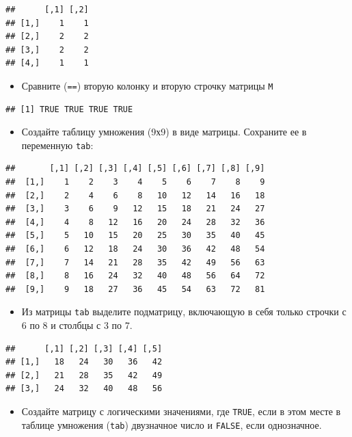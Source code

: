 \documentclass[]{book}
\providecommand{\tightlist}{%
  \setlength{\itemsep}{0pt}\setlength{\parskip}{0pt}}
\begin{document}
\begin{verbatim}
##      [,1] [,2]
## [1,]    1    1
## [2,]    2    2
## [3,]    2    2
## [4,]    1    1
\end{verbatim}

\begin{itemize}
\tightlist
\item
  Сравните (\texttt{==}) вторую колонку и вторую строчку матрицы \texttt{M}
\end{itemize}

\begin{verbatim}
## [1] TRUE TRUE TRUE TRUE
\end{verbatim}

\begin{itemize}
\tightlist
\item
  Создайте таблицу умножения (9х9) в виде матрицы. Сохраните ее в переменную \texttt{tab}:
\end{itemize}

\begin{verbatim}
##       [,1] [,2] [,3] [,4] [,5] [,6] [,7] [,8] [,9]
##  [1,]    1    2    3    4    5    6    7    8    9
##  [2,]    2    4    6    8   10   12   14   16   18
##  [3,]    3    6    9   12   15   18   21   24   27
##  [4,]    4    8   12   16   20   24   28   32   36
##  [5,]    5   10   15   20   25   30   35   40   45
##  [6,]    6   12   18   24   30   36   42   48   54
##  [7,]    7   14   21   28   35   42   49   56   63
##  [8,]    8   16   24   32   40   48   56   64   72
##  [9,]    9   18   27   36   45   54   63   72   81
\end{verbatim}

\begin{itemize}
\tightlist
\item
  Из матрицы \texttt{tab} выделите подматрицу, включающую в себя только строчки с 6 по 8 и столбцы с 3 по 7.
\end{itemize}

\begin{verbatim}
##      [,1] [,2] [,3] [,4] [,5]
## [1,]   18   24   30   36   42
## [2,]   21   28   35   42   49
## [3,]   24   32   40   48   56
\end{verbatim}

\begin{itemize}
\tightlist
\item
  Создайте матрицу с логическими значениями, где \texttt{TRUE}, если в этом месте в таблице умножения (\texttt{tab}) двузначное число и \texttt{FALSE}, если однозначное.
\end{itemize}
\end{document}
